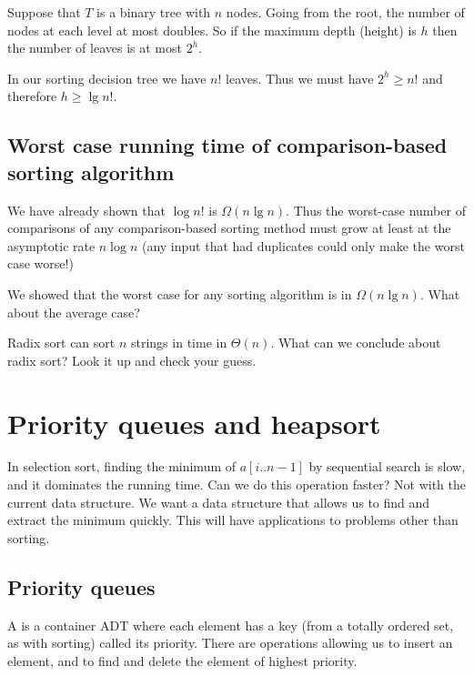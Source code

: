 Suppose that $T$ is a binary tree with $n$ nodes. 
Going from the root, the number of nodes at each level at most doubles.
So if the maximum depth (height) is $h$ then the number of leaves is at most $2^h$. 

In our sorting decision tree we have $n!$ leaves. 
Thus we must have $2^h \geq n!$ and therefore $h \geq \lg n!$. 

\section{Worst case running time of comparison-based sorting algorithm}
We have already shown that $\log n!$ is $\Omega (n \lg n)$. Thus the 
worst-case number of comparisons of any comparison-based sorting method must 
grow at least at the asymptotic rate $n \log n$ (any input that had duplicates 
could only make the worst case worse!)

\begin{Boxample}[4]
We showed that the worst case for any sorting algorithm is in $\Omega (n \lg n)$. What about the average case?
\end{Boxample}

\begin{Boxample}[2]
Radix sort can sort $n$ strings in time in $\Theta(n)$.
What can we conclude about radix sort? Look it up and check your guess.
\end{Boxample}



\chapter{Priority queues and heapsort} %
\label{sec:heapsort}
In selection sort, finding the minimum of $a[i..n-1]$ by sequential search is slow, 
and it dominates the running time. 
Can we do this operation faster? Not with the current data structure. 
We want a data structure that allows us to find and extract the minimum quickly. 
This will have applications to problems other than sorting.

\section{Priority queues}
\begin{Definition}
A  is a container ADT where each element 
has a key (from a totally ordered set, as with sorting) called its priority. There are operations allowing us to insert an 
element, and to find and delete the element of highest priority. 
\end{Definition}

